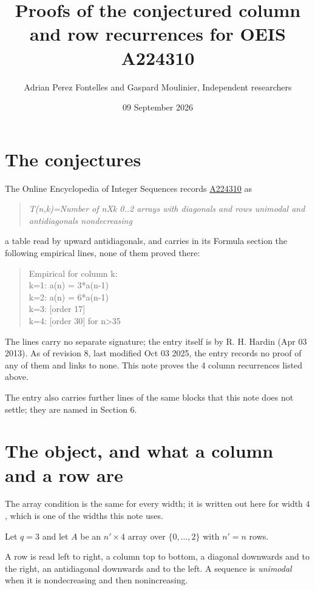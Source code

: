 \documentclass[11pt]{article}
\title{Proofs of the conjectured column and row recurrences for OEIS A224310}
\author{Adrian Perez Fontelles and Gaspard Moulinier, Independent researchers}
\date{09 September 2026}
\theoremstyle{definition}
\begin{document}
\maketitle
\section{The conjectures}

The Online Encyclopedia of Integer Sequences records \href{https://oeis.org/A224310}{A224310} as

\begin{quote}\itshape T(n,k)=Number of nXk 0..2 arrays with diagonals and rows unimodal and antidiagonals nondecreasing\end{quote}

a table read by upward antidiagonals, and carries in its Formula section the following empirical lines, none of them proved there:

\begin{quote}\ttfamily Empirical for column k:\\
k=1: a(n) = 3*a(n-1)\\k=2: a(n) = 6*a(n-1)\\k=3: [order 17]\\k=4: [order 30] for n>35\end{quote}

The lines carry no separate signature; the entry itself is by R. H. Hardin (Apr 03 2013). As of revision 8, last modified Oct 03 2025, the entry records no proof of any of them and links to none. This note proves the 4 column recurrences listed above.

The entry also carries further lines of the same blocks that this note does not settle; they are named in Section 6.

\section{The object, and what a column and a row are}

The array condition is the same for every width; it is written out here for width $4$, which is one of the widths this note uses.

Let $q = 3$ and let $A$ be an $n' \times 4$ array over $\{0,\dots,2\}$ with $n' = n$ rows.

A row is read left to right, a column top to bottom, a diagonal downwards and to the right, an antidiagonal downwards and to the left. A sequence is {\itshape unimodal} when it is nondecreasing and then nonincreasing.
\end{document}
